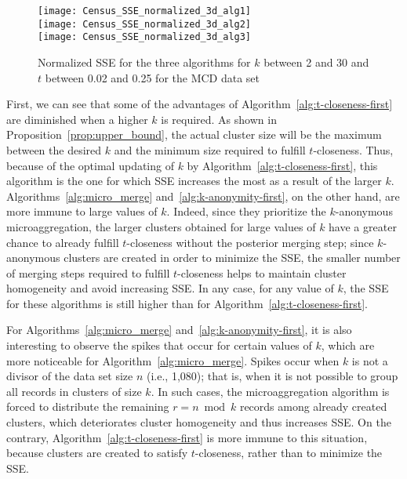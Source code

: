 \documentclass[10pt,journal,compsoc]{IEEEtran}
\theoremstyle{definition}
\theoremstyle{plain}
\begin{document}
\begin{figure}[!t]
\begin{centering}
	\texttt{[image: Census\_SSE\_normalized\_3d\_alg1]}\\
	\vspace{0.4cm}	
\texttt{[image: Census\_SSE\_normalized\_3d\_alg2]}\\
	\vspace{0.4cm}
	\texttt{[image: Census\_SSE\_normalized\_3d\_alg3]}\\
	\vspace{0.4cm}
\par\end{centering}
\protect\caption{Normalized SSE for the three algorithms 
for $k$ between 2 and 30 
and $t$ between 0.02 and 0.25 for the MCD data set\label{fig:SSE-3D}}
	\end{figure}

First, we can see that some of the advantages of Algorithm~\ref{alg:t-closeness-first}
are diminished when a higher $k$ is required. As shown in 
Proposition~\ref{prop:upper_bound}, the actual cluster size will be
the maximum between the desired $k$ and the minimum size
required to fulfill $t$-closeness. Thus, because of the optimal
updating of $k$ by Algorithm~\ref{alg:t-closeness-first},
this algorithm is the one for which SSE increases the most as a 
result of the larger $k$.
Algorithms~\ref{alg:micro_merge} and~\ref{alg:k-anonymity-first},
on the other hand, are more immune to large values of $k$.
Indeed, since they prioritize the $k$-anonymous microaggregation,
the larger clusters obtained for large values of $k$
have a greater chance to already fulfill $t$-closeness
without the posterior merging step;
since $k$-anonymous clusters are created in order to 
minimize the SSE, the smaller number of merging steps required 
to fulfill $t$-closeness helps to maintain cluster homogeneity 
and avoid increasing SSE. In any case, for any value of $k$, the 
SSE for these 
algorithms is still higher than for Algorithm~\ref{alg:t-closeness-first}.

For Algorithms~\ref{alg:micro_merge} and~\ref{alg:k-anonymity-first},
it is also interesting to observe the
spikes that occur for certain values of $k$,
which are more noticeable for Algorithm~\ref{alg:micro_merge}.
Spikes occur when $k$ is not a divisor of the data set size $n$ (i.e., 1,080);
that is, when it is not possible to group all records in clusters
of size $k$.
In such cases, the microaggregation algorithm is forced to distribute
the remaining $r=n \bmod k$ records among already created clusters,
which deteriorates cluster homogeneity and thus increases SSE.
On the contrary, Algorithm~\ref{alg:t-closeness-first} is more immune to this situation,
because clusters are created to satisfy $t$-closeness, rather than
to minimize the SSE.
\end{document}
